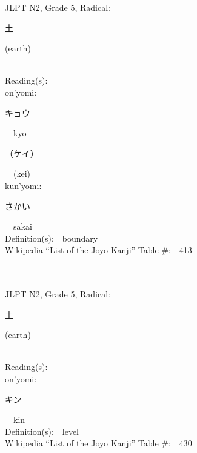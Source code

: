 \begin{multicols}{2}
{JLPT N2, Grade 5, Radical:\ \ {\begin{CJK}{UTF8}{min} 土 \end{CJK}} (earth) } \\
Reading(s):\ \ \\
{\hspace*{1em}}on'yomi:\ \ \\
{\hspace*{2em}}{\begin{CJK}{UTF8}{min} キョウ \end{CJK}}\ \ ky\=o\ \ \\
{\hspace*{2em}}{\begin{CJK}{UTF8}{min} （ケイ） \end{CJK}}\ \ (kei)\ \ \\
{\hspace*{1em}}kun'yomi:\ \ \\
{\hspace*{2em}}{\begin{CJK}{UTF8}{min} さかい \end{CJK}}\ \ sakai\ \ \\
Definition(s):\ \ boundary \\
Wikipedia ``List of the J\=oy\=o Kanji'' Table \#:\ \ 413 \\
\ \ \\
{\fontsize{34pt}{40pt}  }\ \ \\  %
{JLPT N2, Grade 5, Radical:\ \ {\begin{CJK}{UTF8}{min} 土 \end{CJK}} (earth) } \\
Reading(s):\ \ \\
{\hspace*{1em}}on'yomi:\ \ \\
{\hspace*{2em}}{\begin{CJK}{UTF8}{min} キン \end{CJK}}\ \ kin\ \ \\
Definition(s):\ \ level \\
Wikipedia ``List of the J\=oy\=o Kanji'' Table \#:\ \ 430 \\
\ \ \\
{\fontsize{34pt}{40pt}  }\ \ \\  %

\end{multicols}

